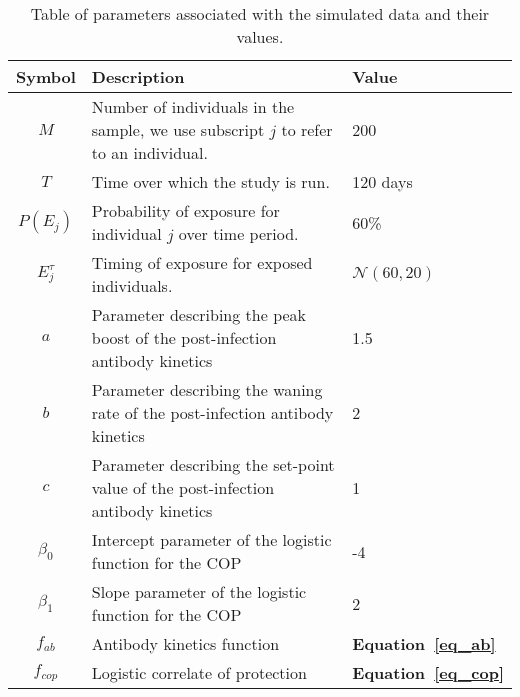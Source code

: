 \begin{table}[H]
    \centering
    \begin{tabular}{|c|l| l| }
         \hline
        \textbf{Symbol} & \textbf{Description} & \textbf{Value}\\
        \hline
         $M$ & Number of individuals in the sample, we use subscript $j$ to refer to an individual.& 200 \\ \hline
         $T$ & Time over which the study is run.  & 120 days \\ \hline         
         $P(E_j)$ & Probability of exposure for individual $j$ over time period.  & 60\% \\ \hline
         $E^\tau_j$ & Timing of exposure for exposed individuals.  & $\mathcal{N}(60, 20)$ \\ \hline
         $a$ & Parameter describing the peak boost of the post-infection antibody kinetics   & 1.5 \\ \hline
         $b$ &  Parameter describing the waning rate of the post-infection antibody kinetics &  2\\ \hline
         $c$ & Parameter describing the set-point value of the post-infection antibody kinetics & 1 \\ \hline
         $\beta_0$ & Intercept parameter of the logistic function for the COP  & -4 \\ \hline
         $\beta_1$&  Slope parameter of the logistic function for the COP  &  2 \\ \hline
         $f_{ab}$ & Antibody kinetics function & \textbf{Equation~\ref{eq_ab}} \\ \hline         
         $f_{cop}$ & Logistic correlate of protection  & \textbf{Equation~\ref{eq_cop}} \\ \hline
    \end{tabular}
    \caption{Table of parameters associated with the simulated data and their values.}  
     \label{table:not_sim}
\end{table}